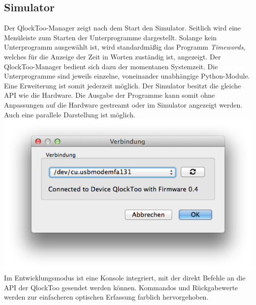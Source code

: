 \begin{multicols}{2}
\subsection{Simulator}
Der QlockToo-Manager zeigt nach dem Start den Simulator. Seitlich wird eine Menüleiste zum Starten der Unterprogramme dargestellt.
Solange kein Unterprogramm ausgewählt ist, wird standardmäßig das Programm \emph{Timewords}, welches für die Anzeige der Zeit in Worten zuständig ist, angezeigt. Der QlockToo-Manager bedient sich dazu der momentanen Systemzeit.
Die Unterprogramme sind jeweils einzelne, voneinander unabhängige Python-Module. Eine Erweiterung ist somit jederzeit möglich.
Der Simulator besitzt die gleiche API wie die Hardware. Die Ausgabe der Programme kann somit ohne Anpassungen auf die Hardware gestreamt oder im Simulator angezeigt werden. Auch eine parallele Darstellung ist möglich.
\includegraphics[width=\columnwidth]{Abbildungen/Software/ConnectDialog}
Im Entwicklungsmodus ist eine Konsole integriert, mit der direkt Befehle an die API der QlockToo gesendet werden können. Kommandos und Rückgabewerte werden zur einfacheren optischen Erfassung farblich hervorgehoben.

\end{multicols}
